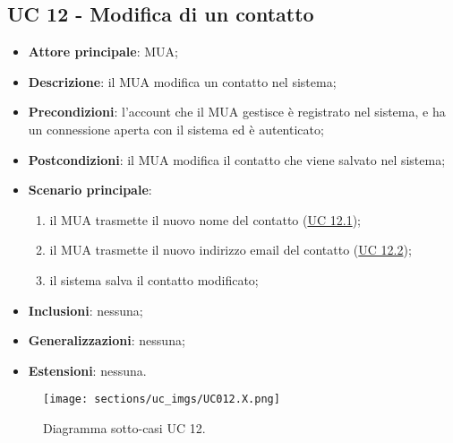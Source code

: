 \subsection{UC 12 - Modifica di un contatto} \label{sec:UC12}
    \begin{itemize}
        \item \textbf{Attore principale}: MUA;
        \item \textbf{Descrizione}: il MUA modifica un contatto nel sistema;
        \item \textbf{Precondizioni}: l’account che il MUA gestisce è registrato nel sistema, e ha un connessione aperta con il sistema ed è autenticato;
        \item \textbf{Postcondizioni}: il MUA modifica il contatto che viene salvato nel sistema;
        \item \textbf{Scenario principale}:
            \begin{enumerate}
                \item il MUA trasmette il nuovo nome del contatto (\hyperref[sec:UC12.1]{UC 12.1});
                \item il MUA trasmette il nuovo indirizzo email del contatto (\hyperref[sec:UC12.2]{UC 12.2});
                \item il sistema salva il contatto modificato;
            \end{enumerate}
        \item \textbf{Inclusioni}: nessuna;
        \item \textbf{Generalizzazioni}: nessuna;
        \item \textbf{Estensioni}: nessuna.
    \end{itemize}

\begin{figure}[h]
    \texttt{[image: sections/uc\_imgs/UC012.X.png]}
    \centering
    \caption{Diagramma sotto-casi UC 12.}
\end{figure}

